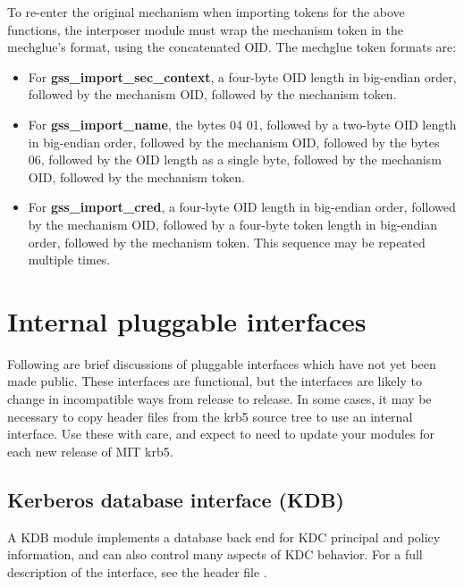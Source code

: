 \documentclass[letterpaper,10pt,english]{sphinxmanual}
\begin{document}
To re-enter the original mechanism when importing tokens for the above
functions, the interposer module must wrap the mechanism token in the
mechglue's format, using the concatenated OID.  The mechglue token
formats are:
\begin{itemize}
\item {} 
For \textbf{gss\_import\_sec\_context}, a four-byte OID length in big-endian
order, followed by the mechanism OID, followed by the mechanism
token.

\item {} 
For \textbf{gss\_import\_name}, the bytes 04 01, followed by a two-byte OID
length in big-endian order, followed by the mechanism OID, followed
by the bytes 06, followed by the OID length as a single byte,
followed by the mechanism OID, followed by the mechanism token.

\item {} 
For \textbf{gss\_import\_cred}, a four-byte OID length in big-endian order,
followed by the mechanism OID, followed by a four-byte token length
in big-endian order, followed by the mechanism token.  This sequence
may be repeated multiple times.

\end{itemize}


\section{Internal pluggable interfaces}
\label{plugindev/internal::doc}\label{plugindev/internal:internal-pluggable-interfaces}
Following are brief discussions of pluggable interfaces which have not
yet been made public.  These interfaces are functional, but the
interfaces are likely to change in incompatible ways from release to
release.  In some cases, it may be necessary to copy header files from
the krb5 source tree to use an internal interface.  Use these with
care, and expect to need to update your modules for each new release
of MIT krb5.


\subsection{Kerberos database interface (KDB)}
\label{plugindev/internal:kerberos-database-interface-kdb}
A KDB module implements a database back end for KDC principal and
policy information, and can also control many aspects of KDC behavior.
For a full description of the interface, see the header file
.
\end{document}
